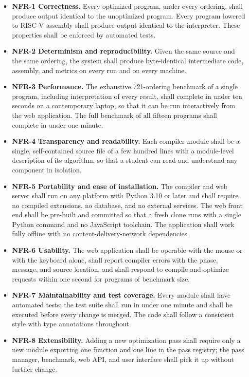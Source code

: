 \begin{itemize}
  \item \textbf{NFR-1 Correctness.} Every optimized program, under every ordering, shall produce output identical to the unoptimized program. Every program lowered to RISC-V assembly shall produce output identical to the interpreter. These properties shall be enforced by automated tests.
  \item \textbf{NFR-2 Determinism and reproducibility.} Given the same source and the same ordering, the system shall produce byte-identical intermediate code, assembly, and metrics on every run and on every machine.
  \item \textbf{NFR-3 Performance.} The exhaustive 721-ordering benchmark of a single program, including interpretation of every result, shall complete in under ten seconds on a contemporary laptop, so that it can be run interactively from the web application. The full benchmark of all fifteen programs shall complete in under one minute.
  \item \textbf{NFR-4 Transparency and readability.} Each compiler module shall be a single, self-contained source file of a few hundred lines with a module-level description of its algorithm, so that a student can read and understand any component in isolation.
  \item \textbf{NFR-5 Portability and ease of installation.} The compiler and web server shall run on any platform with Python 3.10 or later and shall require no compiled extensions, no database, and no external services. The web front end shall be pre-built and committed so that a fresh clone runs with a single Python command and no JavaScript toolchain. The application shall work fully offline with no content-delivery-network dependencies.
  \item \textbf{NFR-6 Usability.} The web application shall be operable with the mouse or with the keyboard alone, shall report compiler errors with the phase, message, and source location, and shall respond to compile and optimize requests within one second for programs of benchmark size.
  \item \textbf{NFR-7 Maintainability and test coverage.} Every module shall have automated tests; the test suite shall run in under one minute and shall be executed before every change is merged. The code shall follow a consistent style with type annotations throughout.
  \item \textbf{NFR-8 Extensibility.} Adding a new optimization pass shall require only a new module exporting one function and one line in the pass registry; the pass manager, benchmark, web API, and user interface shall pick it up without further change.
\end{itemize}

